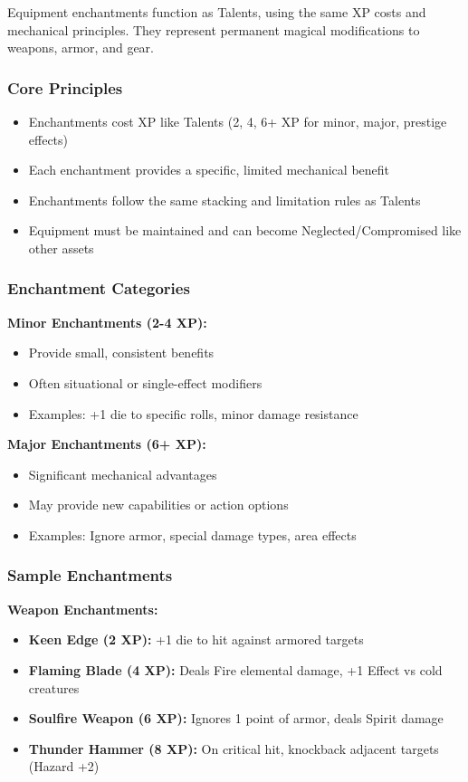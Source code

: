 Equipment enchantments function as Talents, using the same XP costs and mechanical principles. They represent permanent magical modifications to weapons, armor, and gear.

\subsubsection{Core Principles}

\begin{itemize}
\item Enchantments cost XP like Talents (2, 4, 6+ XP for minor, major, prestige effects)
\item Each enchantment provides a specific, limited mechanical benefit
\item Enchantments follow the same stacking and limitation rules as Talents
\item Equipment must be maintained and can become Neglected/Compromised like other assets
\end{itemize}

\subsubsection{Enchantment Categories}

\textbf{Minor Enchantments (2-4 XP):}
\begin{itemize}
\item Provide small, consistent benefits
\item Often situational or single-effect modifiers
\item Examples: +1 die to specific rolls, minor damage resistance
\end{itemize}

\textbf{Major Enchantments (6+ XP):}
\begin{itemize}
\item Significant mechanical advantages
\item May provide new capabilities or action options
\item Examples: Ignore armor, special damage types, area effects
\end{itemize}

\subsubsection{Sample Enchantments}

\textbf{Weapon Enchantments:}
\begin{itemize}
\item \textbf{Keen Edge (2 XP):} +1 die to hit against armored targets
\item \textbf{Flaming Blade (4 XP):} Deals Fire elemental damage, +1 Effect vs cold creatures
\item \textbf{Soulfire Weapon (6 XP):} Ignores 1 point of armor, deals Spirit damage
\item \textbf{Thunder Hammer (8 XP):} On critical hit, knockback adjacent targets (Hazard +2)
\end{itemize}

